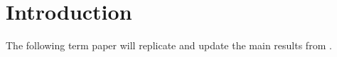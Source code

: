 
\section{Introduction}
\label{sec:introduction}

The following term paper will replicate and update the main results from
\textcite{jerman_macroeconomic_2012}.

\blindtext
